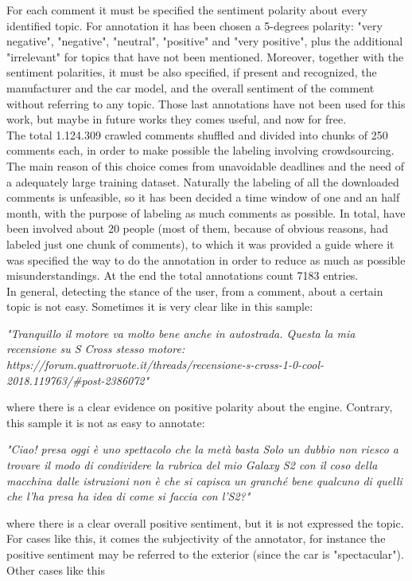 For each comment it must be specified the sentiment polarity about every identified topic. For annotation it has been chosen a 5-degrees polarity: "very negative", "negative", "neutral", "positive" and "very positive", plus the additional "irrelevant" for topics that have not been mentioned. Moreover, together with the sentiment polarities, it must be also specified, if present and recognized, the manufacturer and the car model, and the overall sentiment of the comment without referring to any topic. Those last annotations have not been used for this work, but maybe in future works they comes useful, and now for free.\\
The total 1.124.309 crawled comments shuffled and divided into chunks of 250 comments each, in order to make possible the labeling involving crowdsourcing. The main reason of this choice comes from unavoidable deadlines and the need of a adequately large training dataset. Naturally the labeling of all the downloaded comments is unfeasible, so it has been decided a time window of one and an half month, with the purpose of labeling as much comments as possible. In total, have been involved about 20 people (most of them, because of obvious reasons, had labeled just one chunk of comments), to which it was provided a guide where it was specified the way to do the annotation in order to reduce as much as possible misunderstandings. At the end the total annotations count 7183 entries.\\




In general, detecting the stance of the user, from a comment, about a certain topic is not easy. Sometimes it is very clear like in this sample:

\begin{description}
	\item \textit{"Tranquillo il motore va molto bene anche in autostrada. Questa la mia recensione su S Cross stesso motore: https://forum.quattroruote.it/threads/recensione-s-cross-1-0-cool-2018.119763/\#post-2386072"}
\end{description}
where there is a clear evidence on positive polarity about the engine. Contrary, this sample it is not as easy to annotate:

\begin{description}
	\item \textit{"Ciao! presa oggi è uno spettacolo che la metà basta Solo un dubbio non riesco a trovare il modo di condividere la rubrica del mio Galaxy S2 con il coso della macchina dalle istruzioni non è che si capisca un granché bene qualcuno di quelli che l'ha presa ha idea di come si faccia con l'S2?"}
\end{description}
where there is a clear overall positive sentiment, but it is not expressed the topic. For cases like this, it comes the subjectivity of the annotator, for instance the positive sentiment may be referred to the exterior (since the car is "spectacular").
Other cases like this

